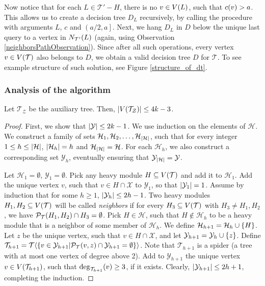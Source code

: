 Now notice that for each $L\in \mathcal{T}'-H$, there is no $v\in V\mathopen{}\left( L \right)$, such that $c\mathopen{}\left( v \right)>a$. This allows us to create a decision tree $D_L$ recursively, by calling the \FCreateDecisionTree procedure with arguments $L$, $c$ and $\left(a/2,a\right]$. Next, we hang $D_L$ in $D$ below the unique last query to a vertex in $N_{\mathcal{T}'}\mathopen{}\left( L \right)$ (again, using Observation \ref{neighborsPathObservation}). Since after all such operations, every vertex $v\in V\mathopen{}\left( \mathcal{T} \right)$ also belongs to $D$, we obtain a valid decision tree $D$ for $\mathcal{T}$. To see example structure of such solution, see Figure \ref{structure_of_dt}.


\subsubsection{Analysis of the algorithm}\begin{lemma}\label{auxTreeSizeLemma}
    Let $\mathcal{T}_{\mathcal{Z}}$ be the auxiliary tree. Then, $\mathopen{}\left| V\mathopen{}\left( \mathcal{T}_{\mathcal{Z}} \right) \right|\leq 4k-3$.
    \begin{proof}
        First, we show that $\mathopen{}\left| \mathcal{Y} \right|\leq 2k-1$. We use induction on the elements of $\mathcal{H}$. We construct a family of sets $\mathcal{H}_1, \mathcal{H}_2, \dots, \mathcal{H}_{\mathopen{}\left| \mathcal{H} \right|}$, such that for every integer $1\leq h \leq \mathopen{}\left| \mathcal{H} \right|$, $\mathopen{}\left| \mathcal{H}_h \right|=h$ and $\mathcal{H}_{\mathopen{}\left| \mathcal{H} \right|} = \mathcal{H}$. For each $\mathcal{H}_h$, we also construct a corresponding set $\mathcal{Y}_h$, eventually ensuring that $\mathcal{Y}_{\mathopen{}\left| \mathcal{H} \right|}=\mathcal{Y}$.
        
        Let $\mathcal{H}_1=\emptyset$, $\mathcal{Y}_1=\emptyset$. Pick any heavy module $H\subseteq V\mathopen{}\left( \mathcal{T} \right)$ and add it to $\mathcal{H}_1$. Add the unique vertex $v$, such that $v\in H\cap\mathcal{X}$ to $\mathcal{Y}_1$, so that $\mathopen{}\left| \mathcal{Y}_1 \right|=1$. Assume by induction that for some $h\geq 1$, $\mathopen{}\left| \mathcal{Y}_h \right|\leq 2h-1$.  
        Two heavy modules $H_1,H_2\subseteq V\mathopen{}\left( \mathcal{T} \right)$ will be called  \textit{neighbors} if for every $H_3\subseteq V\mathopen{}\left( \mathcal{T} \right)$ with $H_3\neq H_1,H_2$, we have $\mathcal{P}_{\mathcal{T}}\mathopen{}\left( H_1,H_2 \right)\cap H_3 = \emptyset$. Pick $H\in\mathcal{H}$, such that $H\notin \mathcal{H}_h$ to be a heavy module that is a neighbor of some member of $\mathcal{H}_h$. We define $\mathcal{H}_{h+1}=\mathcal{H}_h\cup\mathopen{}\left\{ H \right\}$. 
        Let $z$ be the unique vertex, such that $v\in H\cap\mathcal{X}$, and let $\mathcal{Y}_{h+1}=\mathcal{Y}_h \cup \mathopen{}\left\{ z \right\}$. Define $\mathcal{T}_{h+1} = \mathcal{T}\mathopen{}\langle \mathopen{}\left\{ v\in \mathcal{Y}_{h+1} | \mathcal{P}_\mathcal{T}\mathopen{}\left( v,z \right) \cap \mathcal{Y}_{h+1} = \emptyset \right\} \rangle$. Note that $\mathcal{T}_{h+1}$ is a spider (a tree with at most one vertex of degree above 2). Add to $\mathcal{Y}_{h+1}$ the unique vertex $v\in V\mathopen{}\left( \mathcal{T}_{h+1} \right)$, such that $\deg_{\mathcal{T}_{h+1}}\mathopen{}\left( v \right)\geq 3$, if it exists. Clearly, $\mathopen{}\left| \mathcal{Y}_{h+1} \right| \leq 2h+1$, completing the induction.  


\end{proof}
\end{lemma}
